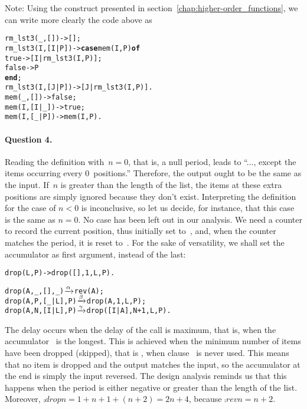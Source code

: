 Note: Using the  construct presented in
section~\vref{chap:higher-order_functions}, we can write more clearly
the code above as
\begin{alltt}
rm_lst3(_,   []) -> [];
rm_lst3(I,[I|P]) -> \textbf{case} mem(I,P) \textbf{of}
                      true  -> [I|rm_lst3(I,P)];
                      false -> P
                    \textbf{end};
rm_lst3(I,[J|P]) -> [J|rm_lst3(I,P)].
mem(_,   [])     -> false;
mem(I,[I|\_])     -> true;
mem(I,[\_|P])     -> mem(I,P).
\end{alltt}

\medskip

\paragraph{Question 4.}

Reading the definition with~\({n=0}\), that is, a null period, leads
to ``..., except the items occurring every \(0\)~positions.''
Therefore, the output ought to be the same as the input. If~\(n\) is
greater than the length of the list, the items at these extra
positions are simply ignored because they don't exist. Interpreting
the definition for the case of \(n < 0\) is inconclusive, so let us
decide, for instance, that this case is the same as \(n=0\). No case
has been left out in our analysis. We need a counter to record the
current position, thus initially set to~, and, when the
counter matches the period, it is reset to~. For the sake
of versatility, we shall set the accumulator as first argument,
instead of the last:
\begin{alltt}
drop(L,P) -> drop([],1,L,P).

drop(A,_,   [],_) \(\smashedrightarrow{\alpha}\) rev(A);
drop(A,P,[_|L],P) \(\smashedrightarrow{\beta}\) drop(A,1,L,P);
drop(A,N,[I|L],P) \(\smashedrightarrow{\gamma}\) drop([I|A],N+1,L,P).
\end{alltt}
The delay occurs when the delay of the call  is
maximum, that is, when the accumulator~ is the
longest. This is achieved when the minimum number of items have been
dropped (skipped), that is , when clause~\clause{\beta} is never
used. This means that no item is dropped and the output matches the
input, so the accumulator at the end is simply the input reversed. The
design analysis reminds us that this happens when the period is either
negative or greater than the length of the list. Moreover,
\(\comp{drop}{n} = 1 + n + 1 + (n+2) = 2n+4\), because \(\comp{rev}{n}
= n+2\).

